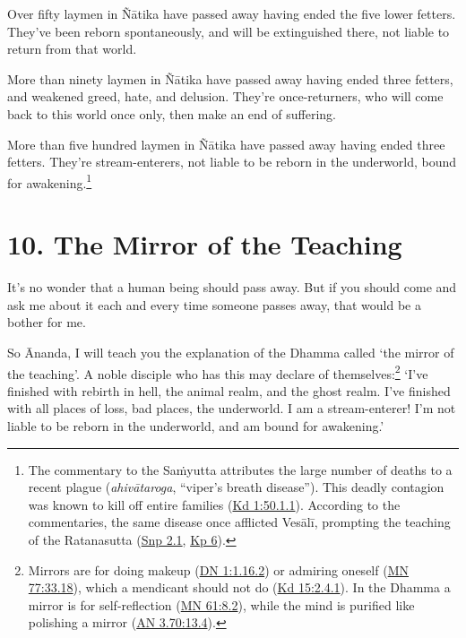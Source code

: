 \documentclass[12pt,openany]{book}%
\begin{document}
Over fifty laymen in \textsanskrit{Ñātika} have passed away having ended the five lower fetters. They’ve been reborn spontaneously, and will be extinguished there, not liable to return from that world. 

More than ninety laymen in \textsanskrit{Ñātika} have passed away having ended three fetters, and weakened greed, hate, and delusion. They’re once-returners, who will come back to this world once only, then make an end of suffering. 

More than five hundred laymen in \textsanskrit{Ñātika} have passed away having ended three fetters. They’re stream-enterers, not liable to be reborn in the underworld, bound for awakening.\footnote{The commentary to the \textsanskrit{Saṁyutta} attributes the large number of deaths to a recent plague (\textit{\textsanskrit{ahivātaroga}}, “viper’s breath disease”). This deadly contagion was known to kill off entire families (\href{https://suttacentral.net/pli-tv-kd1/en/sujato\#50.1.1}{Kd 1:50.1.1}). According to the commentaries, the same disease once afflicted \textsanskrit{Vesālī}, prompting the teaching of the Ratanasutta (\href{https://suttacentral.net/snp2.1/en/sujato}{Snp 2.1}, \href{https://suttacentral.net/kp6/en/sujato}{Kp 6}). } 

\section*{10. The Mirror of the Teaching }

It’s no wonder that a human being should pass away. But if you should come and ask me about it each and every time someone passes away, that would be a bother for me. 

So Ānanda, I will teach you the explanation of the Dhamma called ‘the mirror of the teaching’. A noble disciple who has this may declare of themselves:\footnote{Mirrors are for doing makeup (\href{https://suttacentral.net/dn1/en/sujato\#1.16.2}{DN 1:1.16.2}) or admiring oneself (\href{https://suttacentral.net/mn77/en/sujato\#33.18}{MN 77:33.18}), which a mendicant should not do (\href{https://suttacentral.net/pli-tv-kd15/en/sujato\#2.4.1}{Kd 15:2.4.1}). In the Dhamma a mirror is for self-reflection (\href{https://suttacentral.net/mn61/en/sujato\#8.2}{MN 61:8.2}), while the mind is purified like polishing a mirror (\href{https://suttacentral.net/an3.70/en/sujato\#13.4}{AN 3.70:13.4}). } ‘I’ve finished with rebirth in hell, the animal realm, and the ghost realm. I’ve finished with all places of loss, bad places, the underworld. I am a stream-enterer! I’m not liable to be reborn in the underworld, and am bound for awakening.’ 
\end{document}
